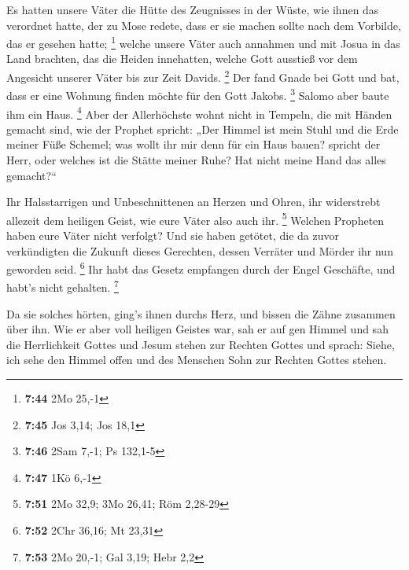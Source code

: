  Es hatten unsere Väter die Hütte des Zeugnisses in der
Wüste, wie ihnen das verordnet hatte, der zu Mose redete, dass er sie
machen sollte nach dem Vorbilde, das er gesehen hatte; \footnote{\textbf{7:44}
  2Mo 25,-1}  welche unsere Väter auch annahmen und mit
Josua in das Land brachten, das die Heiden innehatten, welche Gott
ausstieß vor dem Angesicht unserer Väter bis zur Zeit Davids.
\footnote{\textbf{7:45} Jos 3,14; Jos 18,1}  Der fand
Gnade bei Gott und bat, dass er eine Wohnung finden möchte für den Gott
Jakobs. \footnote{\textbf{7:46} 2Sam 7,-1; Ps 132,1-5} 
Salomo aber baute ihm ein Haus. \footnote{\textbf{7:47} 1Kö 6,-1}
 Aber der Allerhöchste wohnt nicht in Tempeln, die mit
Händen gemacht sind, wie der Prophet spricht:  „Der
Himmel ist mein Stuhl und die Erde meiner Füße Schemel; was wollt ihr
mir denn für ein Haus bauen? spricht der Herr, oder welches ist die
Stätte meiner Ruhe?  Hat nicht meine Hand das alles
gemacht?{}``

 Ihr Halsstarrigen und Unbeschnittenen an Herzen und
Ohren, ihr widerstrebt allezeit dem heiligen Geist, wie eure Väter also
auch ihr. \footnote{\textbf{7:51} 2Mo 32,9; 3Mo 26,41; Röm 2,28-29}
 Welchen Propheten haben eure Väter nicht verfolgt? Und
sie haben getötet, die da zuvor verkündigten die Zukunft dieses
Gerechten, dessen Verräter und Mörder ihr nun geworden seid. \footnote{\textbf{7:52}
  2Chr 36,16; Mt 23,31}  Ihr habt das Gesetz empfangen
durch der Engel Geschäfte, und habt's nicht gehalten. \footnote{\textbf{7:53}
  2Mo 20,-1; Gal 3,19; Hebr 2,2}

 Da sie solches hörten, ging's ihnen durchs Herz, und
bissen die Zähne zusammen über ihn.  Wie er aber voll
heiligen Geistes war, sah er auf gen Himmel und sah die Herrlichkeit
Gottes und Jesum stehen zur Rechten Gottes  und sprach:
Siehe, ich sehe den Himmel offen und des Menschen Sohn zur Rechten
Gottes stehen.

